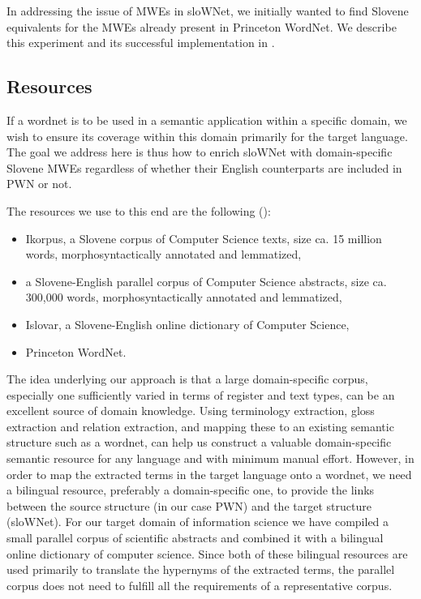 \documentclass[output=paper]{LSP/langsci}
\begin{document}
In addressing the issue of MWEs in sloWNet, we initially wanted to find Slovene equivalents for the MWEs already present in Princeton WordNet. We describe this experiment and its successful implementation in \citep{Vintar2008}.

\subsection{Resources}\label{sec:vintar:3.2}

If a wordnet is to be used in a semantic application within a specific domain, we wish to ensure its coverage within this domain primarily for the target language. The goal we address here is thus how to enrich sloWNet with domain-specific Slovene MWEs regardless of whether their English counterparts are included in PWN or not.

The resources we use to this end are the following (): 

\begin{itemize}
\item 
Ikorpus, a Slovene corpus of Computer Science texts, size ca. 15 million words, morphosyntactically annotated and lemmatized,
\item  
a Slovene-English parallel corpus of Computer Science abstracts, size ca. 300,000 words, morphosyntactically annotated and lemmatized,
\item 
Islovar, a Slovene-English online dictionary of Computer Science,
\item 
Princeton WordNet.
\end{itemize}

The idea underlying our approach is that a large domain-specific corpus, especially one sufficiently varied in terms of register and text types, can be an excellent source of domain knowledge. Using terminology extraction, gloss extraction and relation extraction, and mapping these to an existing semantic structure such as a wordnet, can help us construct a valuable domain-specific semantic resource for any language and with minimum manual effort. However, in order to map the extracted terms in the target language onto a wordnet, we need a bilingual resource, preferably a domain-specific one, to provide the links between the source structure (in our case PWN) and the target structure (sloWNet). For our target domain of information science we have compiled a small parallel corpus of scientific abstracts and combined it with a bilingual online dictionary of computer science. Since both of these bilingual resources are used primarily to translate the hypernyms of the extracted terms, the parallel corpus does not need to fulfill all the requirements of a representative corpus.
\end{document}
